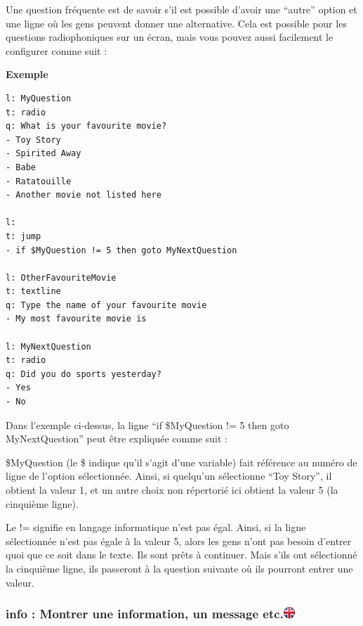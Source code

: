 \documentclass[
]{book}
\begin{document}
Une question fréquente est de savoir s'il est possible d'avoir une
``autre'' option et une ligne où les gens peuvent donner une
alternative. Cela est possible pour les questions radiophoniques sur un
écran, mais vous pouvez aussi facilement le configurer comme suit :

\textbf{Exemple}

\begin{verbatim}
l: MyQuestion
t: radio
q: What is your favourite movie?
- Toy Story
- Spirited Away
- Babe
- Ratatouille
- Another movie not listed here

l:
t: jump
- if $MyQuestion != 5 then goto MyNextQuestion

l: OtherFavouriteMovie
t: textline
q: Type the name of your favourite movie
- My most favourite movie is

l: MyNextQuestion
t: radio
q: Did you do sports yesterday?
- Yes
- No
\end{verbatim}

Dans l'exemple ci-dessus, la ligne ``if \$MyQuestion != 5 then goto
MyNextQuestion'' peut être expliquée comme suit :

\$MyQuestion (le \$ indique qu'il s'agit d'une variable) fait référence
au numéro de ligne de l'option sélectionnée. Ainsi, si quelqu'un
sélectionne ``Toy Story'', il obtient la valeur 1, et un autre choix non
répertorié ici obtient la valeur 5 (la cinquième ligne).

Le != signifie en langage informatique n'est pas égal. Ainsi, si la
ligne sélectionnée n'est pas égale à la valeur 5, alors les gens n'ont
pas besoin d'entrer quoi que ce soit dans le texte. Ils sont prêts à
continuer. Mais s'ils ont sélectionné la cinquième ligne, ils passeront
à la question suivante où ils pourront entrer une valeur.

\hypertarget{info-montrer-une-information-un-message-etc.ukflag}{%
\subsubsection[info : Montrer une information, un message
etc.]{\texorpdfstring{info : Montrer une information, un message
etc.\href{https://www.psytoolkit.org/doc3.1.0/online-survey-syntax.html\#info}{\protect\includegraphics{img/ukflag.png}}}{info : Montrer une information, un message etc.ukflag}}\label{info-montrer-une-information-un-message-etc.ukflag}}
\end{document}

